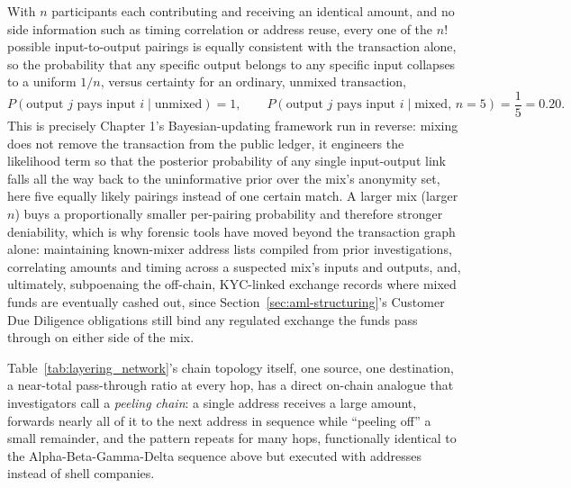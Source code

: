 \documentclass[../ai_in_finance]{subfiles}
\begin{document}
With $n$ participants each contributing and receiving an identical amount, and no side information such as timing correlation or address reuse, every one of the $n!$ possible input-to-output pairings is equally consistent with the transaction alone, so the probability that any specific output belongs to any specific input collapses to a uniform $1/n$, versus certainty for an ordinary, unmixed transaction,
\begin{equation*}
P(\text{output } j \text{ pays input } i \mid \text{unmixed}) = 1, \qquad P(\text{output } j \text{ pays input } i \mid \text{mixed}, \, n=5) = \frac{1}{5} = 0.20.
\end{equation*}
This is precisely Chapter 1's Bayesian-updating framework run in reverse: mixing does not remove the transaction from the public ledger, it engineers the likelihood term so that the posterior probability of any single input-output link falls all the way back to the uninformative prior over the mix's anonymity set, here five equally likely pairings instead of one certain match. A larger mix (larger $n$) buys a proportionally smaller per-pairing probability and therefore stronger deniability, which is why forensic tools have moved beyond the transaction graph alone: maintaining known-mixer address lists compiled from prior investigations, correlating amounts and timing across a suspected mix's inputs and outputs, and, ultimately, subpoenaing the off-chain, KYC-linked exchange records where mixed funds are eventually cashed out, since Section~\ref{sec:aml-structuring}'s Customer Due Diligence obligations still bind any regulated exchange the funds pass through on either side of the mix.

Table~\ref{tab:layering_network}'s chain topology itself, one source, one destination, a near-total pass-through ratio at every hop, has a direct on-chain analogue that investigators call a \emph{peeling chain}: a single address receives a large amount, forwards nearly all of it to the next address in sequence while ``peeling off'' a small remainder, and the pattern repeats for many hops, functionally identical to the Alpha-Beta-Gamma-Delta sequence above but executed with addresses instead of shell companies.
\end{document}
